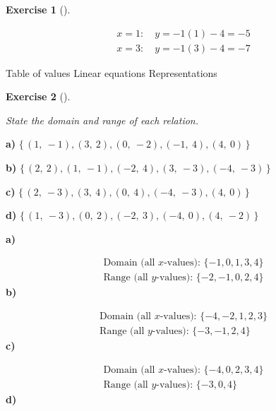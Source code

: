 \documentclass[
  letterpaper,
  DIV=11,
  numbers=noendperiod]{scrreprt}
\theoremstyle{definition}
\newtheorem{exercise}{Exercise}[chapter]
\theoremstyle{remark}
\begin{document}
\begin{exercise}[]
\begin{tcolorbox}
\[
\begin{aligned}
x = 1: \quad y = -1(1) - 4 = -5 \\[4pt] x = 3: \quad y = -1(3) - 4 = -7
\end{aligned}
\]

\end{tcolorbox}

{Table of values} {Linear equations} {Representations}

\end{exercise}

\begin{exercise}[]\protect\hypertarget{exr-u7-5}{}\label{exr-u7-5}

\emph{State the domain and range of each relation.}

\textbf{a)}
\(\displaystyle \{\,(1,\ -1), (3,\ 2), (0,\ -2), (-1,\ 4), (4,\ 0)\,\}\)

\textbf{b)}
\(\displaystyle \{\,(2,\ 2), (1,\ -1), (-2,\ 4), (3,\ -3), (-4,\ -3)\,\}\)

\textbf{c)}
\(\displaystyle \{\,(2,\ -3), (3,\ 4), (0,\ 4), (-4,\ -3), (4,\ 0)\,\}\)

\textbf{d)}
\(\displaystyle \{\,(1,\ -3), (0,\ 2), (-2,\ 3), (-4,\ 0), (4,\ -2)\,\}\)

\begin{tcolorbox}[enhanced jigsaw, opacitybacktitle=0.6, coltitle=black, arc=.35mm, colframe=quarto-callout-tip-color-frame, colback=white, bottomrule=.15mm, left=2mm, colbacktitle=quarto-callout-tip-color!10!white, titlerule=0mm, opacityback=0, title=\textcolor{quarto-callout-tip-color}{\faLightbulb}\hspace{0.5em}{🔍 View Solutions}, leftrule=.75mm, breakable, rightrule=.15mm, bottomtitle=1mm, toptitle=1mm, toprule=.15mm]

\textbf{a)}

\[
\begin{aligned}
\text{Domain (all }x\text{-values): } \{-1, 0, 1, 3, 4\} \\[4pt] \text{Range (all }y\text{-values): } \{-2, -1, 0, 2, 4\}
\end{aligned}
\] \textbf{b)}

\[
\begin{aligned}
\text{Domain (all }x\text{-values): } \{-4, -2, 1, 2, 3\} \\[4pt] \text{Range (all }y\text{-values): } \{-3, -1, 2, 4\}
\end{aligned}
\] \textbf{c)}

\[
\begin{aligned}
\text{Domain (all }x\text{-values): } \{-4, 0, 2, 3, 4\} \\[4pt] \text{Range (all }y\text{-values): } \{-3, 0, 4\}
\end{aligned}
\] \textbf{d)}


\end{tcolorbox}
\end{exercise}
\end{document}
